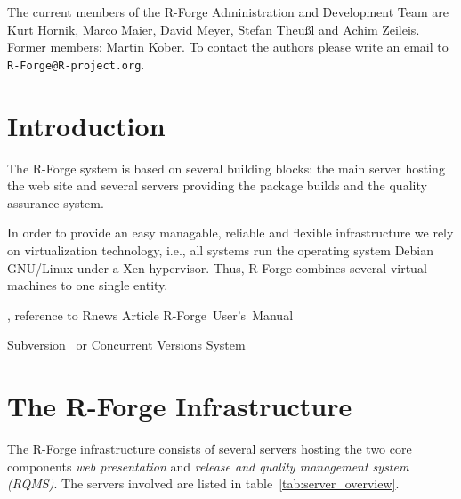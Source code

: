 \documentclass[a4paper]{article}
\newcommand{\RFORGE}{R-Forge Administration and Development Team}
\let\email=\texttt
\begin{document}
\vspace{0.5cm} 

The current members of the \RFORGE{} are Kurt Hornik,
Marco Maier, David Meyer, Stefan Theu\ss{}l and Achim Zeileis. Former
members: Martin Kober. To contact the authors please write an email to
\email{R-Forge@R-project.org}.

\newpage

\pagestyle{plain}
\tableofcontents

\clearpage
\pagestyle{headings}
\setcounter{page}{1}

\section{Introduction}

The R-Forge system is based on several building blocks: the main
server hosting the web site and several servers providing the package
builds and the quality assurance system.

In order to provide an easy managable, reliable and flexible
infrastructure we rely on virtualization technology, i.e., all systems
run the operating system Debian GNU/Linux under a Xen
hypervisor. Thus, R-Forge combines several virtual machines to one
single entity.

, reference to Rnews Article
R-Forge~User's~Manual

Subversion~\citep[SVN,
see][]{forge:Pilato+Collins-Sussman+Fitzpatrick:2004} or Concurrent
Versions System~\citep[CVS, see][]{forge:Cederqvist:2006}


\newpage
\section{The R-Forge Infrastructure}

The R-Forge infrastructure consists of several servers hosting the
two core components \textit{web presentation} and \textit{release and
  quality management system (RQMS)}. The servers involved are listed
in table~\ref{tab:server_overview}.



\end{document}
